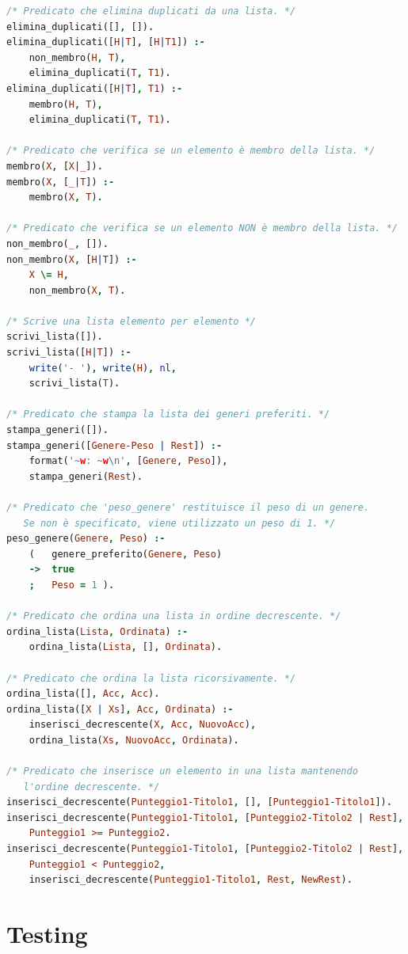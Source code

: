 \documentclass[a4paper,11pt]{article}
\begin{document}
\begin{lstlisting}[language=Prolog]
/* Predicato che elimina duplicati da una lista. */
elimina_duplicati([], []).
elimina_duplicati([H|T], [H|T1]) :- 
    non_membro(H, T),
    elimina_duplicati(T, T1).
elimina_duplicati([H|T], T1) :- 
    membro(H, T),
    elimina_duplicati(T, T1).

/* Predicato che verifica se un elemento è membro della lista. */
membro(X, [X|_]).
membro(X, [_|T]) :- 
    membro(X, T).

/* Predicato che verifica se un elemento NON è membro della lista. */
non_membro(_, []).
non_membro(X, [H|T]) :- 
    X \= H,
    non_membro(X, T).

/* Scrive una lista elemento per elemento */
scrivi_lista([]).
scrivi_lista([H|T]) :- 
    write('- '), write(H), nl,
    scrivi_lista(T).

/* Predicato che stampa la lista dei generi preferiti. */
stampa_generi([]).
stampa_generi([Genere-Peso | Rest]) :- 
    format('~w: ~w\n', [Genere, Peso]),
    stampa_generi(Rest).

/* Predicato che 'peso_genere' restituisce il peso di un genere.
   Se non è specificato, viene utilizzato un peso di 1. */
peso_genere(Genere, Peso) :-
    (   genere_preferito(Genere, Peso) 
    ->  true 
    ;   Peso = 1 ).

/* Predicato che ordina una lista in ordine decrescente. */
ordina_lista(Lista, Ordinata) :-
    ordina_lista(Lista, [], Ordinata).

/* Predicato che ordina la lista ricorsivamente. */
ordina_lista([], Acc, Acc).
ordina_lista([X | Xs], Acc, Ordinata) :-
    inserisci_decrescente(X, Acc, NuovoAcc),
    ordina_lista(Xs, NuovoAcc, Ordinata).

/* Predicato che inserisce un elemento in una lista mantenendo
   l'ordine decrescente. */
inserisci_decrescente(Punteggio1-Titolo1, [], [Punteggio1-Titolo1]).
inserisci_decrescente(Punteggio1-Titolo1, [Punteggio2-Titolo2 | Rest], [Punteggio1-Titolo1, Punteggio2-Titolo2 | Rest]) :-
    Punteggio1 >= Punteggio2.
inserisci_decrescente(Punteggio1-Titolo1, [Punteggio2-Titolo2 | Rest], [Punteggio2-Titolo2 | NewRest]) :-
    Punteggio1 < Punteggio2,
    inserisci_decrescente(Punteggio1-Titolo1, Rest, NewRest).   
\end{lstlisting}

\newpage
\section{Testing}
\end{document}
